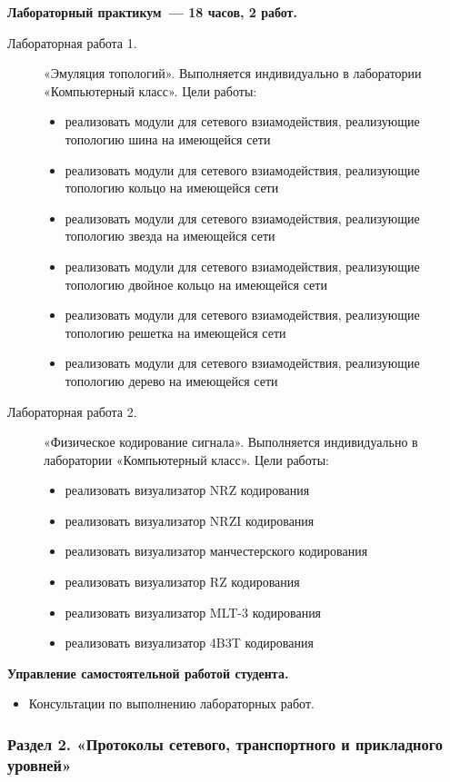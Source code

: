 {\textbf{Лабораторный практикум~— 18 часов, 2 работ.}
\begin{description}
\item[Лабораторная работа 1.] «Эмуляция топологий». Выполняется индивидуально в лаборатории «Компьютерный класс». Цели работы: \begin{itemize}
\item реализовать модули для сетевого взиамодействия, реализующие топологию шина на имеющейся сети\item реализовать модули для сетевого взиамодействия, реализующие топологию кольцо на имеющейся сети\item реализовать модули для сетевого взиамодействия, реализующие топологию звезда на имеющейся сети\item реализовать модули для сетевого взиамодействия, реализующие топологию двойное кольцо на имеющейся сети\item реализовать модули для сетевого взиамодействия, реализующие топологию решетка на имеющейся сети\item реализовать модули для сетевого взиамодействия, реализующие топологию дерево на имеющейся сети
\end{itemize}\item[Лабораторная работа 2.] «Физическое кодирование сигнала». Выполняется индивидуально в лаборатории «Компьютерный класс». Цели работы: \begin{itemize}
\item реализовать визуализатор NRZ кодирования\item реализовать визуализатор NRZI кодирования\item реализовать визуализатор манчестерского кодирования\item реализовать визуализатор RZ кодирования\item реализовать визуализатор MLT-3 кодирования\item реализовать визуализатор 4B3T кодирования
\end{itemize}
\end{description}

\textbf{Управление самостоятельной работой студента.}
\begin{itemize}
\item Консультации по выполнению лабораторных работ.
\end{itemize}
}


\subsubsection{Раздел 2. «Протоколы сетевого, транспортного и прикладного уровней»}

